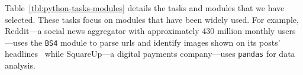 {Table~\ref{tbl:python-tasks-modules} details the tasks and modules that we have selected. These tasks focus on modules that have been widely used.
For example, Reddit---a social news aggregator with approximately 430 million monthly users---uses the \texttt{BS4} module
to parse 
urls and identify images shown on its posts' headlines~\cite{bs4-reddit} while SquareUp---a digital  payments company---uses \texttt{pandas} for data analysis. 






















}
